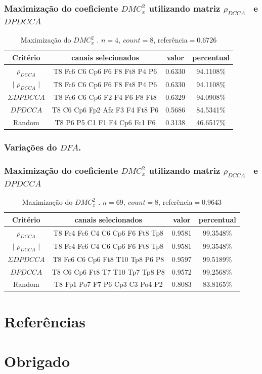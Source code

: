 \documentclass[11pt, aspectratio=169]{beamer}
\newcommand{\dmc}{\(DMC_x^2\) }
\newcommand{\pdcca}{\({\rho}_{DCCA}\) }
\newcommand{\dfa}{$DFA$}
\begin{document}
\begin{frame}
\frametitle{Maximização do coeficiente \dmc utilizando matriz \pdcca~e $DPDCCA$}
\begin{table}[h!]
    \centering
    \caption{Maximização do \dmc. $n=4,~ count=8$, referência$= 0.6726$} \label{tab:time_69}
    \begin{tabular}{c|c|c|c}
      \hline
      Critério & canais selecionados & valor & percentual \\
      \hline
      \hline
      \pdcca & T8 Fc6 C6 Cp6 F6 F8 Ft8 P4 P6 & 0.6330  & 94.1108\% \\
      $|$ \pdcca $|$ & T8 Fc6 C6 Cp6 F6 F8 Ft8 P4 P6  & 0.6330 & 94.1108\% \\
      $\Sigma DPDCCA$ & T8 Fc6 C6 Cp6 F2 F4 F6 F8 Ft8 & 0.6329 &  94.0908\% \\
      $DPDCCA$ & T8 C6 Cp6 Fp2 Afz F3 F4 Ft8 P6 & 0.5686 & 84.5341\% \\
      Random & T8 P6 P5 C1 F1 F4 Cp6 Fc1 F6 & 0.3138 & 46.6517\% \\
      
      \hline
    \end{tabular}
  \end{table}
\end{frame}

\frametitle{Variações do \dfa.}



\begin{frame}
\frametitle{Maximização do coeficiente \dmc utilizando matriz \pdcca~e $DPDCCA$}

  \begin{table}[h!]
    \centering
    \caption{Maximização do \dmc. $n=69,~ count=8$, referência$=0.9643 $} \label{tab:time_69}
    \begin{tabular}{c|c|c|c}
      \hline
      Critério & canais selecionados & valor & percentual \\
      \hline
      \hline
      \pdcca & T8 Fc4 Fc6 C4 C6 Cp6 F6 Ft8 Tp8 & 0.9581  & 99.3548\% \\
      $|$ \pdcca $|$ & T8 Fc4 Fc6 C4 C6 Cp6 F6 Ft8 Tp8  & 0.9581 & 99.3548\% \\
      $\Sigma DPDCCA$ & T8 Fc6 C6 Cp6 Ft8 T10 Tp8 P6 P8 & 0.9597 &  99.5189\% \\
      $DPDCCA$ & T8 C6 Cp6 Ft8 T7 T10 Tp7 Tp8 P8 & 0.9572 & 99.2568\% \\
      Random & T8 Fp1 Po7 F7 P6 Cp3 C3 Po4 P2 & 0.8083 & 83.8165\% \\
      \hline
    \end{tabular}
  \end{table}  

\end{frame}


\section{Referências}

\begin{frame}[allowframebreaks]

  

\end{frame}

\section*{Obrigado}
\end{document}
